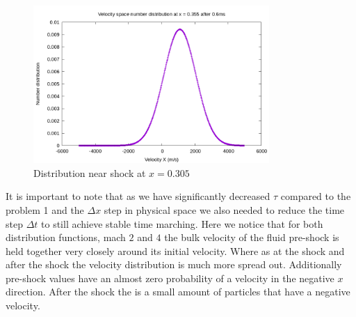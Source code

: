 \documentclass[paper=a4, fontsize=12pt]{scrartcl}
\begin{document}
\begin{figure}[H]
        \centering
        \includegraphics[width=0.8\textwidth]{center_shock-m_4}
        \caption{Distribution near shock at $x = 0.305$ }
        \label{fig:center_shock-m_4}
\end{figure}
It is important to note that as we have significantly decreased $\tau$ compared to the
problem 1 and the $\Delta x$ step in physical space we also needed to reduce
the time step $\Delta t$ to still achieve stable time marching.
Here we notice that for both distribution functions, mach $2$ and $4$ the bulk
velocity of the fluid pre-shock is held together very closely around its initial velocity.
Where as at the shock and after the shock the velocity distribution is much more spread out.
Additionally pre-shock values have an almost zero probability of a velocity in the
negative $x$ direction.
After the shock the is a small amount of particles that have a negative velocity.
\end{document}

